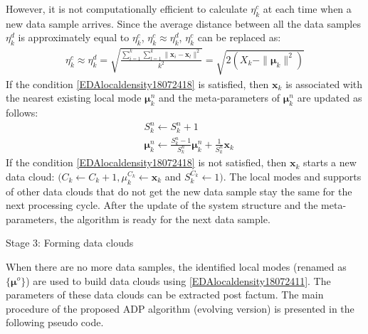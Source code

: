 However, it is not computationally efficient to calculate $\eta_k^c$ at each time when a new data sample arrives. Since the average distance between all the data samples $\eta_k^d$ is approximately equal to $\eta_k^c$, $\eta_k^c\approx \eta_k^d$, $\eta_k^c$ can be replaced as:
\begin{align}\label{EDAlocaldensity18072419}
  \eta_k^c\approx \eta_k^d=\sqrt{\frac{\sum_{i=1}^k\sum_{l=1}^k \|\bm x _i-\bm x _l\|^2 }{k^2}}=\sqrt{2(X_k-\|\bm\mu_k\|^2)}
\end{align}
If the condition \eqref{EDAlocaldensity18072418} is satisfied, then $\bm x_k$ is associated with the nearest existing local mode $\bm \mu^n_k$ and the meta-parameters of $\bm \mu^n_k$ are updated as follows:
\begin{align}
  &S^n_k \leftarrow S^n_k + 1 \label{EDAlocaldensity18072420}\\
  &\bm\mu^n_ k \leftarrow \frac{S^n_k  - 1}{S^n_k}\bm \mu^n_k + \frac 1 {S^n_k}\bm x_k\label{EDAlocaldensity18072421}
\end{align}
If the condition \eqref{EDAlocaldensity18072418} is not satisfied, then $\bm x_k$ starts a new data cloud: $(C_k \leftarrow C_k + 1,\mu_k^{C_k} \leftarrow \bm x_k$ and $S_k^{C_k} \leftarrow 1)$.
The local modes and supports of other data clouds that do not get the new data sample stay the same for the next processing cycle. After the update of the system structure and the meta-parameters, the algorithm is ready for the next data sample.

Stage 3: Forming data clouds

When there are no more data samples, the identified local modes (renamed as $\{\bm \mu^o\}$) are used to build data clouds using \eqref{EDAlocaldensity18072411}. The parameters of these data clouds can be extracted post factum.
The main procedure of the proposed ADP algorithm (evolving version) is presented in the following pseudo code.

